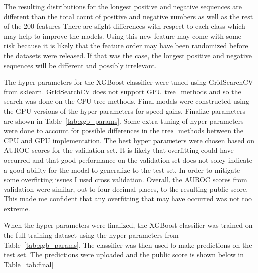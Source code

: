 \documentclass[11pt,letterpaper]{article}
\begin{document}
The resulting distributions for the longest positive and negative sequences are
different than the total count of positive and negative numbers as well as the
rest of the 200 features There are slight differences with respect to each class
which may help to improve the models.  Using this new feature may come with some
risk because it is likely that the feature order may have been randomized before
the datasets were released.  If that was the case, the longest positive and
negative sequences will be different and possibly irrelevant.

The hyper parameters for the XGBoost classifier were tuned using GridSearchCV
from sklearn.  GridSearchCV does not support GPU tree\_methods and so the search
was done on the CPU tree methods.  Final models were constructed using the GPU
versions of the hyper parameters for speed gains.  Finalize parameters are shown
in Table~\ref{tab:xgb_params}.  Some extra tuning of hyper parameters were done
to account for possible differences in the tree\_methods between the CPU and GPU
implementation.  The best hyper parameters were chosen based on AUROC scores
for the validation set.  It is likely that overfitting could have occurred and
that good performance on the validation set does not soley indicate a good ability for
the model to generalize to the test set.  In order to mitigate some overfitting
issues I used cross validation.  Overall, the AUROC scores from validation were
similar, out to four decimal places, to the resulting public score.  This made
me confident that any overfitting that may have occurred was not too extreme.

\begin{table}[h!]
\centering
\caption{XGBoost final hyper parameters}
\label{tab:xgb_params}
\end{table}

When the hyper parameters were finalized, the XGBoost classifier was trained on
the full training dataset using the hyper parameters from
Table~\ref{tab:xgb_params}.  The classifier was then used to make predictions on
the test set.  The predictions were uploaded and the public score is shown below
in Table~\ref{tab:final}
\end{document}
